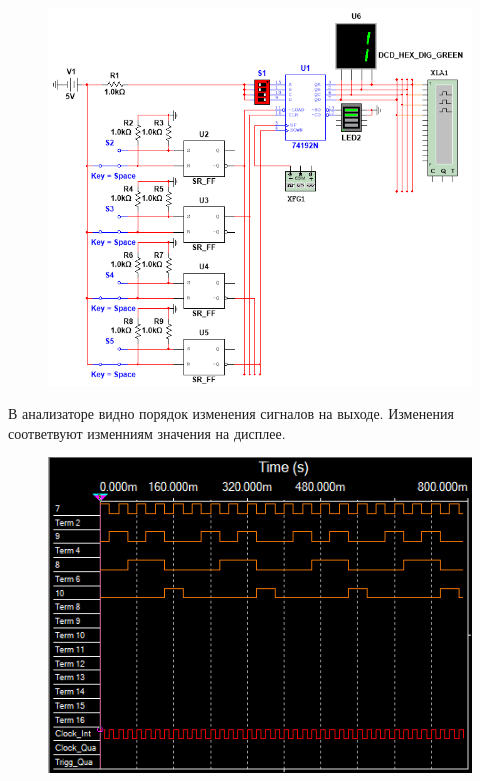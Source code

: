 \begin{figure}[h!]
    \centering
    \includegraphics[scale=0.7]{images/image-11.png}
    \label{image:11}
\end{figure}

В анализаторе видно порядок изменения сигналов на выходе. Изменения соответвуют изменниям значения на дисплее.

\begin{figure}[h!]
    \centering
    \includegraphics[scale=0.6]{images/image-12.png}
    \label{image:12}
\end{figure}